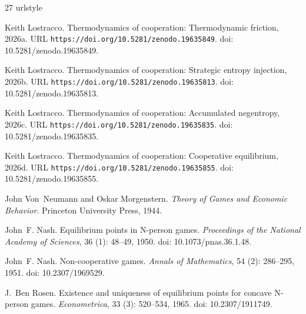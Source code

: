\documentclass[11pt]{article}
\theoremstyle{plain}
\theoremstyle{definition}
\theoremstyle{remark}
\begin{document}
\begin{thebibliography}{27}
\providecommand{\natexlab}[1]{#1}
\providecommand{\url}[1]{\texttt{#1}}
\expandafter\ifx\csname urlstyle\endcsname\relax
  \providecommand{\doi}[1]{doi: #1}\else
  \providecommand{\doi}{doi: \begingroup \urlstyle{rm}\Url}\fi

\bibitem[Lostracco(2026{\natexlab{a}})]{TC-IV}
Keith Lostracco.
\newblock Thermodynamics of cooperation: Thermodynamic friction,
  2026{\natexlab{a}}.
\newblock URL \url{https://doi.org/10.5281/zenodo.19635849}.
\newblock \doi{10.5281/zenodo.19635849}.

\bibitem[Lostracco(2026{\natexlab{b}})]{TC-II}
Keith Lostracco.
\newblock Thermodynamics of cooperation: Strategic entropy injection,
  2026{\natexlab{b}}.
\newblock URL \url{https://doi.org/10.5281/zenodo.19635813}.
\newblock \doi{10.5281/zenodo.19635813}.

\bibitem[Lostracco(2026{\natexlab{c}})]{TC-III}
Keith Lostracco.
\newblock Thermodynamics of cooperation: Accumulated negentropy,
  2026{\natexlab{c}}.
\newblock URL \url{https://doi.org/10.5281/zenodo.19635835}.
\newblock \doi{10.5281/zenodo.19635835}.

\bibitem[Lostracco(2026{\natexlab{d}})]{TC-V}
Keith Lostracco.
\newblock Thermodynamics of cooperation: Cooperative equilibrium,
  2026{\natexlab{d}}.
\newblock URL \url{https://doi.org/10.5281/zenodo.19635855}.
\newblock \doi{10.5281/zenodo.19635855}.

John Von~Neumann and Oskar Morgenstern.
\newblock \emph{Theory of Games and Economic Behavior}.
\newblock Princeton University Press, 1944.

John~F. Nash.
\newblock Equilibrium points in {N}-person games.
\newblock \emph{Proceedings of the National Academy of Sciences}, 36
  (1): 48--49, 1950.
\newblock \doi{10.1073/pnas.36.1.48}.

John~F. Nash.
\newblock Non-cooperative games.
\newblock \emph{Annals of Mathematics}, 54 (2): 286--295,
  1951.
\newblock \doi{10.2307/1969529}.

J.~Ben Rosen.
\newblock Existence and uniqueness of equilibrium points for concave {N}-person
  games.
\newblock \emph{Econometrica}, 33 (3): 520--534, 1965.
\newblock \doi{10.2307/1911749}.


\end{thebibliography}
\end{document}
